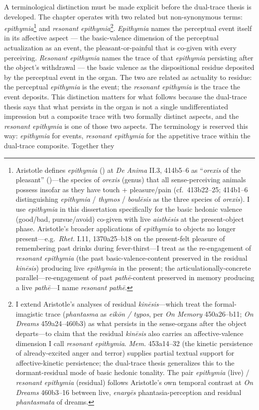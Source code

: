 A terminological distinction must be made explicit before the dual-trace thesis is developed. The chapter operates with two related but non-synonymous terms: \textit{epithymia}\footnote{Aristotle defines \textit{epithymia} () at \textit{De Anima} II.3, 414b5--6 as ``\textit{orexis} of the pleasant'' ()---the species of \textit{orexis} (genus) that all sense-perceiving animals possess insofar as they have touch + pleasure/pain (cf.\ 413b22--25; 414b1--6 distinguishing \textit{epithymia} / \textit{thymos} / \textit{boulēsis} as the three species of \textit{orexis}). I use \textit{epithymia} in this dissertation specifically for the basic hedonic valence (good/bad, pursue/avoid) co-given with live \textit{aisthēsis} at the present-object phase. Aristotle's broader applications of \textit{epithymia} to objects no longer present---e.g.\ \textit{Rhet.} I.11, 1370a25--b18 on the present-felt pleasure of remembering past drinks during fever-thirst---I treat as the re-engagement of \textit{resonant epithymia} (the past basic-valence-content preserved in the residual \textit{kinēsis}) producing live \textit{epithymia} in the present; the articulationally-concrete parallel---re-engagement of past \textit{pathē}-content preserved in memory producing a live \textit{pathē}---I name \textit{resonant pathē}.} and \textit{resonant epithymia}\footnote{I extend Aristotle's analyses of residual \textit{kinēsis}---which treat the formal-imagistic trace (\textit{phantasma} as \textit{eikōn / typos}, per \textit{On Memory} 450a26--b11; \textit{On Dreams} 459a24--460b3) as what persists in the sense-organs after the object departs---to claim that the residual \textit{kinēsis} also carries an affective-valence dimension I call \textit{resonant epithymia}. \textit{Mem.} 453a14--32 (the kinetic persistence of already-excited anger and terror) supplies partial textual support for affective-kinetic persistence; the dual-trace thesis generalizes this to the dormant-residual mode of basic hedonic tonality. The pair \textit{epithymia} (live) / \textit{resonant epithymia} (residual) follows Aristotle's own temporal contrast at \textit{On Dreams} 460b3--16 between live, \textit{enargēs} phantasia-perception and residual \textit{phantasmata} of dreams.}. \textit{Epithymia} names the perceptual event itself in its affective aspect --- the basic-valence dimension of the perceptual actualization as an event, the pleasant-or-painful that is co-given with every perceiving. \textit{Resonant epithymia} names the trace of that \textit{epithymia} persisting after the object's withdrawal --- the basic valence as the dispositional residue deposited by the perceptual event in the organ. The two are related as actuality to residue: the perceptual \textit{epithymia} is the event; the \textit{resonant epithymia} is the trace the event deposits. This distinction matters for what follows because the dual-trace thesis says that what persists in the organ is not a single undifferentiated impression but a composite trace with two formally distinct aspects, and the \textit{resonant epithymia} is one of those two aspects. The terminology is reserved this way: \textit{epithymia} for events, \textit{resonant epithymia} for the appetitive trace within the dual-trace composite. Together they 